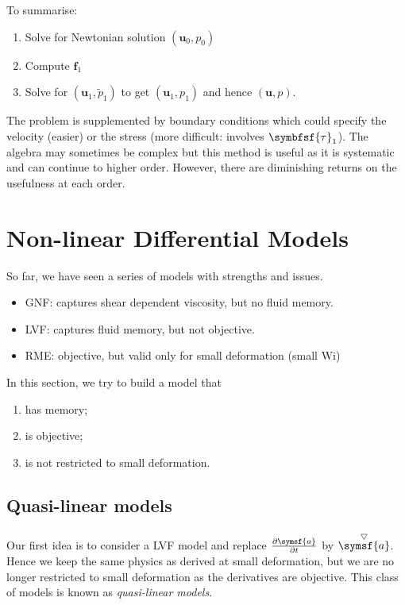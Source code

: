 \documentclass{jknotes}
\newcommand{\ucd}[1]{\stackrel{\bigtriangledown}{#1}}
\begin{document}
To summarise:
\begin{enumerate}
	\item Solve for Newtonian solution $(\symbf{u}_0, p_0)$
	\item Compute $\symbf{f}_1$
	\item Solve for $(\symbf{u}_1, \tilde{p}_1)$ to get $(\symbf{u}_1, p_1)$
		and hence $(\symbf{u},p)$.
\end{enumerate}
The problem is supplemented by boundary conditions which could specify the
velocity (easier) or the stress (more difficult: involves $\symbfsf{\tau}_1$).
The algebra may sometimes be complex but this method is useful as it is
systematic and can continue to higher order. However, there are diminishing
returns on the usefulness at each order. 

\section{Non-linear Differential Models}
So far, we have seen a series of models with strengths and issues.
\begin{itemize}
	\item GNF: captures shear dependent viscosity, but no fluid memory.
	\item LVF: captures fluid memory, but not objective.
	\item RME: objective, but valid only for small deformation (small
		$\text{Wi}$)
\end{itemize}
In this section, we try to build a model that
\begin{enumerate}
	\item has memory;
	\item is objective;
	\item is not restricted to small deformation.
\end{enumerate}

\subsection{Quasi-linear models}
Our first idea is to consider a LVF model and replace $\frac{\partial
\symsf{a}}{\partial t}$ by $\ucd{\symsf{a}}$. Hence we keep the same physics
as derived at small deformation, but we are no longer restricted to small
deformation as the derivatives are objective. This class of models is known as
\emph{quasi-linear models}.
\end{document}
